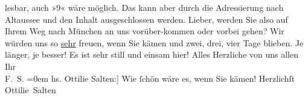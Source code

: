 \begin{ledgroupsized}[t]{13cm}
{{{                     lesbar, auch »9« wäre möglich. Das kann aber durch die Adressierung nach Altaussee und den Inhalt ausgeschlossen
                     werden.}}}\label{K_L03574-1h}\pend
           \pstart{}Lieber,\pend\pstart
           werden Sie also auf Ihrem Weg nach München an
               uns vorüber-kommen oder vorbei gehen? Wir würden uns so \uline{sehr} freuen, wenn Sie kämen und zwei, drei, vier Tage blieben. Je länger, je
               besser! Es ist sehr still und einsam hier! \pend
           \pstart
           Alles Herzliche von uns allen {\\[\baselineskip]}Ihr {\\[\baselineskip]}\spacefill\mbox{F. S.}\pend
           \leftskip=0em{}\pstart
           \noindent{}{[}hs. Ottilie Salten:{]} Wie ſchön wäre es, wenn Sie kämen!\pend
           \pstart Herzlichſt \spacefill\mbox{Ottilie Salten}\pend{}
         
         \endnumbering{}\end{ledgroupsized}\begin{anhang}\end{anhang}\newcommand{\dateiname}{L03574}\newcommand{\titel}{Felix und Ottilie Salten an Arthur Schnitzler, 17. [8.?] 1921}\newcommand{\editorInnen}{Martin Anton Müller und Laura Untner}
      